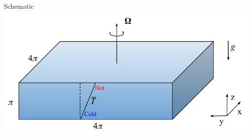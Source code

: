 \documentclass{beamer}
\begin{document}
\begin{frame}{Schematic}
    \includegraphics[width = \textwidth]{images/schematic.pdf}

\end{frame}
\end{document}
